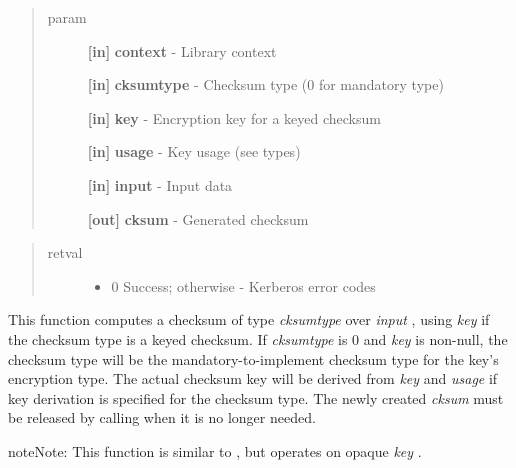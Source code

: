 \documentclass[letterpaper,10pt,english]{sphinxmanual}
\begin{document}
\begin{quote}\begin{description}
\item[{param}] \leavevmode
\textbf{{[}in{]}} \textbf{context} - Library context

\textbf{{[}in{]}} \textbf{cksumtype} - Checksum type (0 for mandatory type)

\textbf{{[}in{]}} \textbf{key} - Encryption key for a keyed checksum

\textbf{{[}in{]}} \textbf{usage} - Key usage (see  types)

\textbf{{[}in{]}} \textbf{input} - Input data

\textbf{{[}out{]}} \textbf{cksum} - Generated checksum

\end{description}\end{quote}
\begin{quote}\begin{description}
\item[{retval}] \leavevmode\begin{itemize}
\item {} 
0   Success; otherwise - Kerberos error codes

\end{itemize}

\end{description}\end{quote}

This function computes a checksum of type \emph{cksumtype} over \emph{input} , using \emph{key} if the checksum type is a keyed checksum. If \emph{cksumtype} is 0 and \emph{key} is non-null, the checksum type will be the mandatory-to-implement checksum type for the key's encryption type. The actual checksum key will be derived from \emph{key} and \emph{usage} if key derivation is specified for the checksum type. The newly created \emph{cksum} must be released by calling {\hyperref[appdev/refs/api/krb5_free_checksum_contents:krb5_free_checksum_contents]{}} when it is no longer needed.




{\hyperref[appdev/refs/api/krb5_c_verify_checksum:krb5_c_verify_checksum]{}}



\begin{notice}{note}{Note:}
This function is similar to {\hyperref[appdev/refs/api/krb5_c_make_checksum:krb5_c_make_checksum]{}} , but operates on opaque \emph{key} .
\end{notice}
\end{document}
